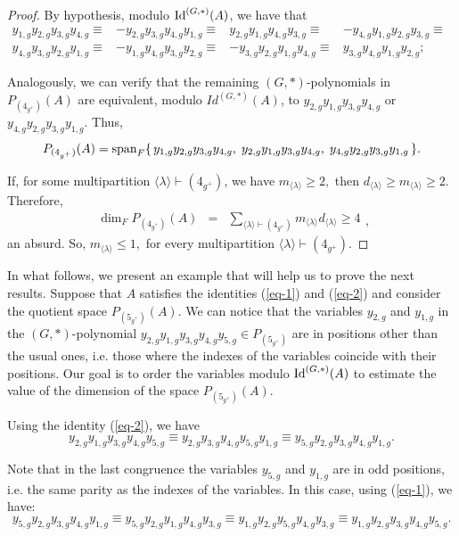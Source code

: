 \documentclass{amsart}
\newcommand{\IdG}{\ensuremath{\textnormal{Id}^{(G,\ast)}}}
\newcommand{\spam}{\ensuremath{\textnormal{span}}}
\numberwithin{equation}{section}
\begin{document}
     \begin{proof} 
 By hypothesis, modulo $\IdG(A)$, we have that 
 $$\begin{array}{clccccccl}
 y_{1,g}y_{2,g}y_{3,g}y_{4,g} \equiv& - y_{2,g}y_{3,g}y_{4,g} y_{1,g} \equiv& y_{2,g}y_{1,g}y_{4,g} y_{3,g} \equiv &- y_{4,g}y_{1,g}y_{2,g} y_{3,g}  \equiv & \\ y_{4,g}y_{3,g}y_{2,g} y_{1,g} \equiv & - y_{1,g}y_{4,g}y_{3,g}y_{2,g} \equiv &- y_{3,g}y_{2,g}y_{1,g}y_{4,g} \equiv & y_{3,g}y_{4,g}y_{1,g}y_{2,g}; 
 \end{array}$$

Analogously, we can verify that the remaining $(G,*)$-polynomials in $P_{(4_{g^+})}(A)$ are equivalent, modulo $Id^{(G,*)}(A)$, to $y_{2,g}y_{1,g}y_{3,g}y_{4,g}$ or $y_{4,g}y_{2,g}y_{3,g}y_{1,g}$. Thus,  
$$
P_{(4_{g^+})}(A) = \spam_F \{ \, y_{1,g}y_{2,g}y_{3,g}y_{4,g}, \; y_{2,g}y_{1,g}y_{3,g}y_{4,g}, \; y_{4,g}y_{2,g}y_{3,g}y_{1,g} \,\}.$$

If, for some multipartition $\langle \lambda \rangle \vdash (4_{g^+})$, we have $m_{\langle \lambda \rangle}\ge 2,$ then $d_{\langle \lambda \rangle}\geq m_{\langle \lambda \rangle}\ge 2.$ Therefore, $$\begin{array}{ccl}\dim_FP_{(4_{g^+})}(A)& =& \sum\limits_{\langle \lambda \rangle \vdash (4_{g^+})}m_{\langle \lambda \rangle}d_{\langle \lambda \rangle} \ge 4 \end{array},$$  an 
	absurd. So, $m_{\langle \lambda \rangle}\le 1,$  for every multipartition   $\langle \lambda \rangle \vdash (4_{g^+})$.
\end{proof}

In what follows, we  present an example that will help us to prove the next results. Suppose that $A$ satisfies the identities (\ref{eq-1}) and (\ref{eq-2}) and consider the quotient space $P_{(5_{g^+})}(A)$. 
We can notice that the variables $y_{2,g}$ and $y_{1,g}$ in the $(G,*)$-polynomial $y_{2,g}y_{1,g}y_{3,g}y_{4,g}y_{5,g} \in P_{(5_{g^+})}$ are in positions other than the usual ones, i.e. those where the indexes of the variables coincide with their positions. Our goal is to order the variables modulo $\IdG(A)$ to estimate the value of  the dimension of the space $P_{(5_{g^+})}(A)$.

 Using the identity (\ref{eq-2}), we have 
$$y_{2,g}y_{1,g}y_{3,g}y_{4,g}y_{5,g}\equiv y_{2,g}y_{3,g}y_{4,g}y_{5,g}y_{1,g}   \equiv y_{5,g}y_{2,g}y_{3,g}y_{4,g}y_{1,g}.
$$ 

Note that in the last congruence the variables $y_{5,g}$ and $y_{1,g}$ are in odd positions, i.e. the same parity as the indexes of the variables. In this case, using (\ref{eq-1}), we have: $$y_{5,g}y_{2,g}y_{3,g}y_{4,g}y_{1,g}  \equiv y_{5,g}y_{2,g}y_{1,g}y_{4,g}y_{3,g} \equiv y_{1,g}y_{2,g}y_{5,g}y_{4,g}y_{3,g} \equiv y_{1,g}y_{2,g}y_{3,g}y_{4,g}y_{5,g}.$$ 
\end{document}
